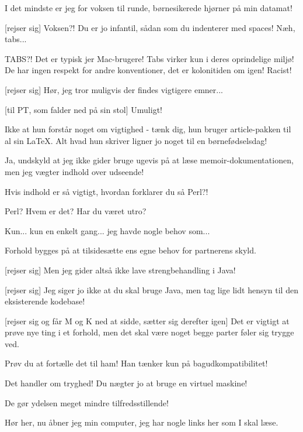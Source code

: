 \documentclass[a4paper,11pt]{article}
\begin{document}
\begin{sketch}
   I det mindste er jeg for voksen til runde, børnesikerede hjørner
  på min datamat!

  [rejser sig] Voksen?!  Du er jo infantil, sådan som du
  indenterer med spaces! Næh, tabs...

   TABS?! Det er typisk jer Mac-brugere!  
  Tabs virker kun i deres oprindelige miljø! De har ingen respekt for
  andre konventioner, det er kolonitiden om igen!  Racist!

  [rejser sig] Hør, jeg tror muligvis der findes vigtigere emner...

  [til PT, som falder ned på sin stol] Umuligt!


   Ikke at hun forstår noget om vigtighed - tænk dig, hun
  bruger article-pakken til al sin \LaTeX.  Alt hvad hun skriver
  ligner jo noget til en børnefødselsdag!

   Ja, undskyld at jeg ikke gider bruge ugevis på at læse
  memoir-dokumentationen, men jeg vægter indhold over udseende!

   Hvis indhold er så vigtigt, hvordan forklarer du så Perl?!

   Perl?  Hvem er det?  Har du været utro?

   Kun... kun en enkelt gang... jeg havde nogle behov som...

   Forhold bygges på at tilsidesætte ens egne behov for partnerens skyld.

  [rejser sig] Men jeg gider altså ikke lave strengbehandling i Java!

  [rejser sig] Jeg siger jo ikke at du skal bruge Java, men tag
  lige lidt hensyn til den eksisterende kodebase!

  [rejser sig og får M og K ned at sidde, sætter sig derefter
    igen] Det er vigtigt at prøve nye ting i et forhold, men det skal
  være noget begge parter føler sig trygge ved.

   Prøv du at fortælle det til ham! Han tænker kun på bagudkompatibilitet!

   Det handler om tryghed!  Du nægter jo at bruge en virtuel maskine!

   De gør ydelsen meget mindre tilfredsstillende!

   Hør her, nu åbner jeg min computer, jeg har nogle links
  her som I skal læse.


\end{sketch}
\end{document}
